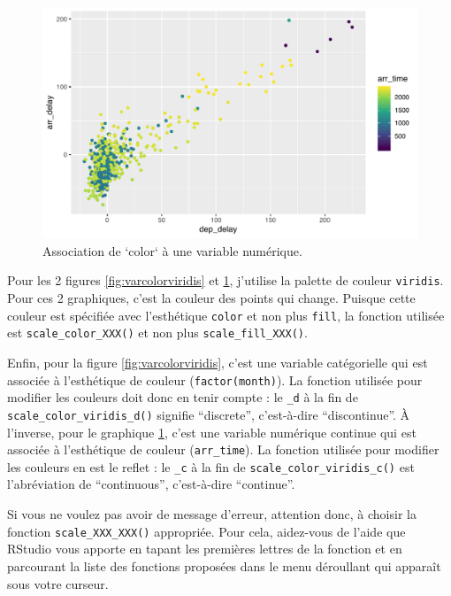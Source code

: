 \documentclass[
  a4paper,
]{article}
\begin{document}
\begin{figure}[htpb]

{\centering \includegraphics[width=0.9\linewidth]{figure/varcolorviridis2-1} 

}

\caption{Association de `color` à une variable numérique.}\label{fig:varcolorviridis2}
\end{figure}

Pour les 2 figures \ref{fig:varcolorviridis} et \ref{fig:varcolorviridis2}, j'utilise la palette de couleur \texttt{viridis}. Pour ces 2 graphiques, c'est la couleur des points qui change. Puisque cette couleur est spécifiée avec l'esthétique \texttt{color} et non plus \texttt{fill}, la fonction utilisée est \texttt{scale\_color\_XXX()} et non plus \texttt{scale\_fill\_XXX()}.

Enfin, pour la figure \ref{fig:varcolorviridis}, c'est une variable catégorielle qui est associée à l'esthétique de couleur (\texttt{factor(month)}). La fonction utilisée pour modifier les couleurs doit donc en tenir compte : le \texttt{\_d} à la fin de \texttt{scale\_color\_viridis\_d()} signifie ``discrete'', c'est-à-dire ``discontinue''. À l'inverse, pour le graphique \ref{fig:varcolorviridis2}, c'est une variable numérique continue qui est associée à l'esthétique de couleur (\texttt{arr\_time}). La fonction utilisée pour modifier les couleurs en est le reflet : le \texttt{\_c} à la fin de \texttt{scale\_color\_viridis\_c()} est l'abréviation de ``continuous'', c'est-à-dire ``continue''.

Si vous ne voulez pas avoir de message d'erreur, attention donc, à choisir la fonction \texttt{scale\_XXX\_XXX()} appropriée. Pour cela, aidez-vous de l'aide que RStudio vous apporte en tapant les premières lettres de la fonction et en parcourant la liste des fonctions proposées dans le menu déroullant qui apparaît sous votre curseur.
\end{document}
